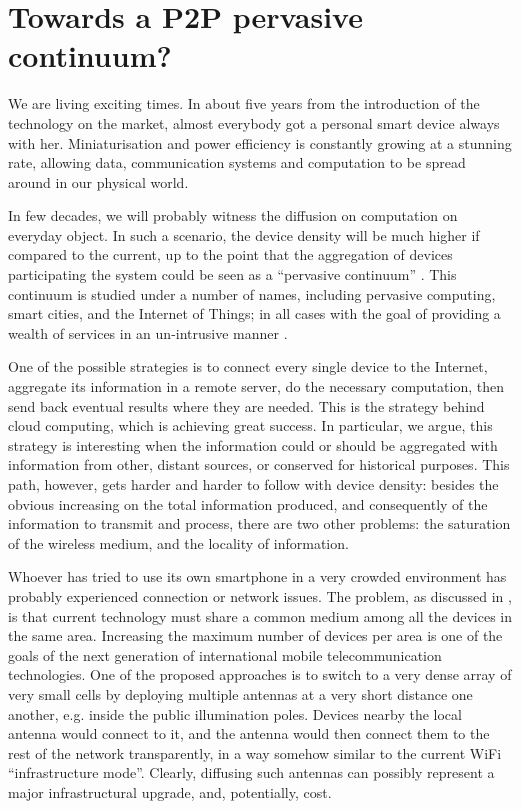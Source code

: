 \documentclass[12pt,a4paper,twoside,openright]{book}
\begin{document}
\section{Towards a P2P pervasive continuum?}

We are living exciting times.
%
In about five years from the introduction of the technology on the market, almost everybody got a personal smart device always with her.
%
Miniaturisation and power efficiency is constantly growing at a stunning rate, allowing data, communication systems and computation to be spread around in our physical world.

In few decades, we will probably witness the diffusion on computation on everyday object.
%
In such a scenario, the device density will be much higher if compared to the current, up to the point that the aggregation of devices participating the system could be seen as a ``pervasive continuum'' \cite{sapere-procedia7}.
%
This continuum is studied under a number of names, including pervasive computing, smart cities, and the Internet of Things; in all cases with the goal of providing a wealth of services in an un-intrusive manner \cite{ker2014,Conti12,zam12,Harnie12}.

One of the possible strategies is to connect every single device to the Internet, aggregate its information in a remote server, do the necessary computation, then send back eventual results where they are needed.
%
This is the strategy behind cloud computing, which is achieving great success.
%
In particular, we argue, this strategy is interesting when the information could or should be aggregated with information from other, distant sources, or conserved for historical purposes.
%
This path, however, gets harder and harder to follow with device density: besides the obvious increasing on the total information produced, and consequently of the information to transmit and process, there are two other problems: the saturation of the wireless medium, and the locality of information.

Whoever has tried to use its own smartphone in a very crowded environment has probably experienced connection or network issues.
%
The problem, as discussed in , is that current technology must share a common medium among all the devices in the same area.
%
Increasing the maximum number of devices per area is one of the goals of the next generation of international mobile telecommunication technologies.
%
One of the proposed approaches is to switch to a very dense array of very small cells by deploying multiple antennas at a very short distance one another, e.g. inside the public illumination poles.
%
Devices nearby the local antenna would connect to it, and the antenna would then connect them to the rest of the network transparently, in a way somehow similar to the current WiFi ``infrastructure mode''.
%
Clearly, diffusing such antennas can possibly represent a major infrastructural upgrade, and, potentially, cost.
\end{document}
